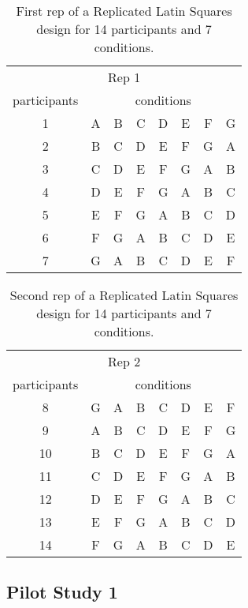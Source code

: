 \begin{table}[h] %
\centering
\caption[Latin Squares Design Rep 1]{\centering First rep of a Replicated Latin Squares design for 14 participants and 7 conditions.}
\label{table_latin_squares_rep_1}
\begin{tabular}{c | c c c c c c c}
    \hline
    \multicolumn{8}{c}{Rep 1} \\
    participants & \multicolumn{7}{c}{conditions} \\
    \hline
    1 & A & B & C & D & E & F & G \\
    2 & B & C & D & E & F & G & A \\
    3 & C & D & E & F & G & A & B \\
    4 & D & E & F & G & A & B & C \\
    5 & E & F & G & A & B & C & D \\
    6 & F & G & A & B & C & D & E \\
    7 & G & A & B & C & D & E & F \\
    \hline
\end{tabular}
\end{table}

\begin{table}[h] %
\centering
\caption[Latin Squares Design Rep 2]{\centering Second rep of a Replicated Latin Squares design for 14 participants and 7 conditions.}
\label{table_latin_squares_rep_2}
\begin{tabular}{c | c c c c c c c}
    \hline
    \multicolumn{8}{c}{Rep 2} \\
    participants & \multicolumn{7}{c}{conditions} \\
    \hline
    8 & G & A & B & C & D & E & F \\
    9 & A & B & C & D & E & F & G \\
    10 & B & C & D & E & F & G & A \\
    11 & C & D & E & F & G & A & B \\
    12 & D & E & F & G & A & B & C \\
    13 & E & F & G & A & B & C & D \\
    14 & F & G & A & B & C & D & E \\
    \hline
\end{tabular}
\end{table}

\subsection{Pilot Study 1}

